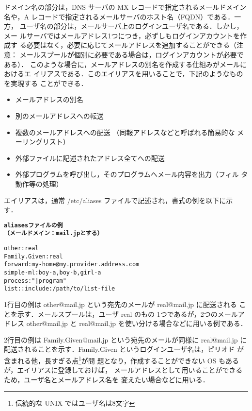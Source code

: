ドメイン名の部分は，DNS サーバの MX レコードで指定されるメールドメイン
名や，A レコードで指定されるメールサーバのホスト名（FQDN）である．一方，
ユーザ名の部分は，メールサーバ上のログインユーザ名である．しかし，メー
ルサーバではメールアドレス1つにつき，必ずしもログインアカウントを作成す
る必要はなく，必要に応じてメールアドレスを追加することができる（注意：
メールスプールが個別に必要である場合は，ログインアカウントが必要である）．
このような場合に，メールアドレスの別名を作成する仕組みがメールにおけるエ
イリアスである．このエイリアスを用いることで，下記のようなものを実現する
ことができる．

\begin{itemize}
\item メールアドレスの別名
\item 別のメールアドレスへの転送
\item 複数のメールアドレスへの配送 （同報アドレスなどと呼ばれる簡易的な
      メーリングリスト）
\item 外部ファイルに記述されたアドレス全てへの配送
\item 外部プログラムを呼び出し，そのプログラムへメール内容を出力（フィル
      タ動作等の処理）
\end{itemize}

エイリアスは，通常 /etc/aliases ファイルで記述され，書式の例を以下に示
す．
\begin{center}
\begin{breakbox}
\begin{alltt}

     {\bf  aliases ファイルの例}
     {\bf  （メールドメイン： mail.jp とする）}

other:  real
Family.Given:  real
forward:  my-home@my.provider.address.com
simple-ml:   boy-a, boy-b, girl-a
process:  "|program"
list: :include:/path/to/list-file
\end{alltt}
\end{breakbox}
\end{center}

1行目の例は other@mail.jp という宛先のメールが real@mail.jp に配送される
ことを示す．メールスプールは，ユーザ real のもの 1つであるが，2つのメールア
ドレス other@mail.jp と real@mail.jp を使い分ける場合などに用いる例である．

2行目の例は Family.Given@mail.jp という宛先のメールが同様に real@mail.jp 
に配送されることを示す．Family.Given というログインユーザ名は，ピリオド
が含まれる他，長すぎる点\footnote{伝統的な UNIX ではユーザ名は8文字}が問
題となり，作成することができない OS もあるが，エイリアスに登録しておけば，
メールアドレスとして用いることができるため，ユーザ名とメールアドレス名を
変えたい場合などに用いる．


